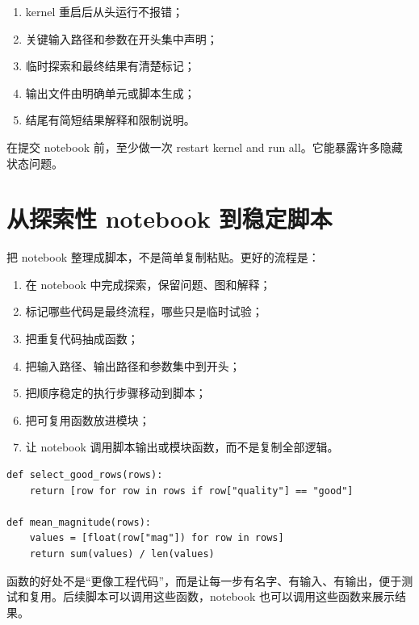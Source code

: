 \begin{enumerate}
    \item kernel 重启后从头运行不报错；
    \item 关键输入路径和参数在开头集中声明；
    \item 临时探索和最终结果有清楚标记；
    \item 输出文件由明确单元或脚本生成；
    \item 结尾有简短结果解释和限制说明。
\end{enumerate}

\begin{protip}
在提交 notebook 前，至少做一次 restart kernel and run all。它能暴露许多隐藏状态问题。
\end{protip}

\section{从探索性 notebook 到稳定脚本}

把 notebook 整理成脚本，不是简单复制粘贴。更好的流程是：

\begin{enumerate}
    \item 在 notebook 中完成探索，保留问题、图和解释；
    \item 标记哪些代码是最终流程，哪些只是临时试验；
    \item 把重复代码抽成函数；
    \item 把输入路径、输出路径和参数集中到开头；
    \item 把顺序稳定的执行步骤移动到脚本；
    \item 把可复用函数放进模块；
    \item 让 notebook 调用脚本输出或模块函数，而不是复制全部逻辑。
\end{enumerate}

\begin{examplebox}[探索代码到函数]
\begin{lstlisting}[style=pythonstyle]
def select_good_rows(rows):
    return [row for row in rows if row["quality"] == "good"]

def mean_magnitude(rows):
    values = [float(row["mag"]) for row in rows]
    return sum(values) / len(values)
\end{lstlisting}
\end{examplebox}

函数的好处不是“更像工程代码”，而是让每一步有名字、有输入、有输出，便于测试和复用。后续脚本可以调用这些函数，notebook 也可以调用这些函数来展示结果。

